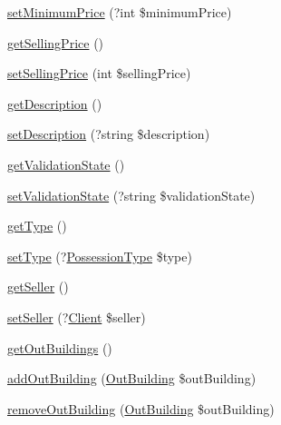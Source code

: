 \begin{DoxyCompactItemize}
\item 
\mbox{\hyperlink{class_app_1_1_entity_1_1_possession_adc36e5e810a12415930576cad7cdf374}{set\+Minimum\+Price}} (?int \$minimum\+Price)
\item 
\mbox{\hyperlink{class_app_1_1_entity_1_1_possession_ae0c5e94a3c82632618ed2bb41db23e0f}{get\+Selling\+Price}} ()
\item 
\mbox{\hyperlink{class_app_1_1_entity_1_1_possession_addd1e66ddb3a33cff07bca1873a7051c}{set\+Selling\+Price}} (int \$selling\+Price)
\item 
\mbox{\hyperlink{class_app_1_1_entity_1_1_possession_a2e7bb35c71bf1824456ceb944cb7a845}{get\+Description}} ()
\item 
\mbox{\hyperlink{class_app_1_1_entity_1_1_possession_acee77db44e361e2773e2734033f2a1c5}{set\+Description}} (?string \$description)
\item 
\mbox{\hyperlink{class_app_1_1_entity_1_1_possession_a7588a9a8519d61108721df413ed38cc9}{get\+Validation\+State}} ()
\item 
\mbox{\hyperlink{class_app_1_1_entity_1_1_possession_a0df0b12be43c05af10182d7b99e0a099}{set\+Validation\+State}} (?string \$validation\+State)
\item 
\mbox{\hyperlink{class_app_1_1_entity_1_1_possession_a830b5c75df72b32396701bc563fbe3c7}{get\+Type}} ()
\item 
\mbox{\hyperlink{class_app_1_1_entity_1_1_possession_a2f23bce944a97283749468aa79bca8e2}{set\+Type}} (?\mbox{\hyperlink{class_app_1_1_entity_1_1_possession_type}{Possession\+Type}} \$type)
\item 
\mbox{\hyperlink{class_app_1_1_entity_1_1_possession_aa04e7c373d84d417cd93dc9189ea7c81}{get\+Seller}} ()
\item 
\mbox{\hyperlink{class_app_1_1_entity_1_1_possession_a6b059faa47527728a837186b352237ee}{set\+Seller}} (?\mbox{\hyperlink{class_app_1_1_entity_1_1_client}{Client}} \$seller)
\item 
\mbox{\hyperlink{class_app_1_1_entity_1_1_possession_abf441a42ccc864bf8016020c8e54cb43}{get\+Out\+Buildings}} ()
\item 
\mbox{\hyperlink{class_app_1_1_entity_1_1_possession_aeb68d3c9f42f5aa840a9e8eb2120fc30}{add\+Out\+Building}} (\mbox{\hyperlink{class_app_1_1_entity_1_1_out_building}{Out\+Building}} \$out\+Building)
\item 
\mbox{\hyperlink{class_app_1_1_entity_1_1_possession_ad36d98ddaebdf108070c32b6ef6b8668}{remove\+Out\+Building}} (\mbox{\hyperlink{class_app_1_1_entity_1_1_out_building}{Out\+Building}} \$out\+Building)

\end{DoxyCompactItemize}
